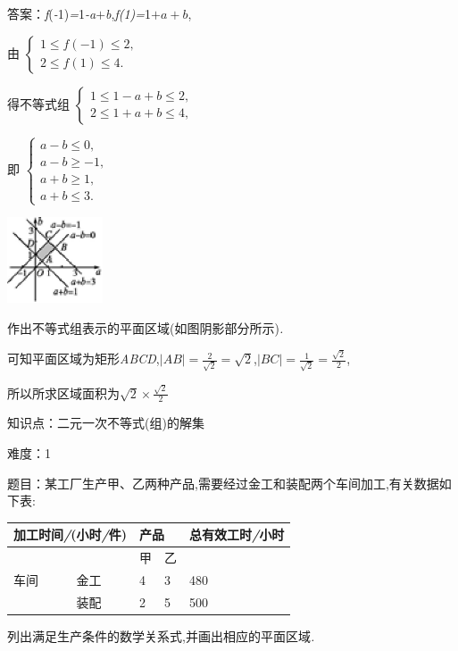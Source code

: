 \documentclass{article} %
\begin{document}
 答案：\textit{f}(\textit{-}1)\textit{=}1\textit{-a$+$b},\textit{f(1)}\textit{=}1\textit{$+a+b$},

由
$
\begin{cases}
1 \le f(-1) \le 2,\\
2 \le f(1) \le 4.
\end{cases}$


得不等式组
$
\begin{cases}
1 \le 1-a+b \le 2,\\
2 \le 1+a+b \le 4,
\end{cases}$

即
$
\begin{cases}
a-b \le 0,\\
a-b \ge -1,\\
a+b \ge 1,\\
a+b \le 3.
\end{cases}$


 \includegraphics*[width=1.11in, height=1.00in, keepaspectratio=false]{image1519}

作出不等式组表示的平面区域(如图阴影部分所示)\textit{.}

可知平面区域为矩形\textit{ABCD},$|AB|=\frac{2}{\sqrt{2}}=\sqrt{2}$,$|BC|=\frac{1}{\sqrt{2}}=\frac{\sqrt{2}}{2}$,

所以所求区域面积为$\sqrt{2}\times \frac{\sqrt{2}}{2}$

知识点：二元一次不等式(组)的解集

难度：1

题目：某工厂生产甲、乙两种产品,需要经过金工和装配两个车间加工,有关数据如下表:

\begin{tabular}{|p{0.8in}|p{0.7in}|p{0.2in}|p{0.2in}|p{1.3in}|} \hline 
	\multicolumn{2}{|p{1in}|}{加工时间\textit{/}(小时\textit{/}件)} & \multicolumn{2}{|p{0.4in}|}{产品} & 总有效工时\textit{/}小时 \\ \hline 
	\multicolumn{2}{|p{1in}|}{} & 甲 & 乙 &  \\ \hline 
	车间 & 金工 & 4 & 3 & 480 \\ \hline 
	& 装配 & 2 & 5 & 500 \\ \hline 
\end{tabular}


 列出满足生产条件的数学关系式,并画出相应的平面区域\textit{.}
\end{document}
